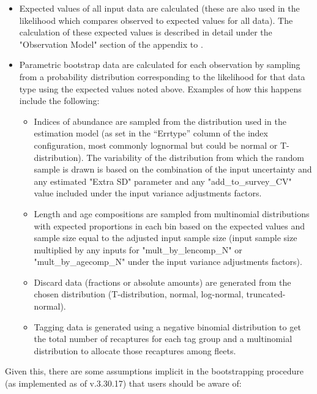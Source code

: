 \begin{itemize}
	\item Expected values of all input data are calculated (these are also used in the likelihood which compares observed to expected values for all data). The calculation of these expected values is described in detail under the "Observation Model" section of the appendix to \citet{methotstock2013}. \
	
	\item Parametric bootstrap data are calculated for each observation by sampling from a probability distribution corresponding to the likelihood for that data type using the expected values noted above. Examples of how this happens include the following:
	
	\begin{itemize}
		\item Indices of abundance are sampled from the distribution used in the estimation model (as set in the “Errtype” column of the index configuration, most commonly lognormal but could be normal or T-distribution). The variability of the distribution from which the random sample is drawn is based on the combination of the input uncertainty and any estimated "Extra SD" parameter and any "add\_to\_survey\_CV" value included under the input variance adjustments factors.
		
		\item Length and age compositions are sampled from multinomial distributions with expected proportions in each bin based on the expected values and sample size equal to the adjusted input sample size (input sample size multiplied by any inputs for "mult\_by\_lencomp\_N" or "mult\_by\_agecomp\_N" under the input variance adjustments factors).
		
		\item Discard data (fractions or absolute amounts) are generated from the chosen distribution (T-distribution, normal, log-normal, truncated-normal).
		
		\item Tagging data is generated using a negative binomial distribution to get the total number of recaptures for each tag group and a multinomial distribution to allocate those recaptures among fleets.
	\end{itemize}
\end{itemize}

Given this, there are some assumptions implicit in the bootstrapping procedure (as implemented as of v.3.30.17) that users should be aware of:

